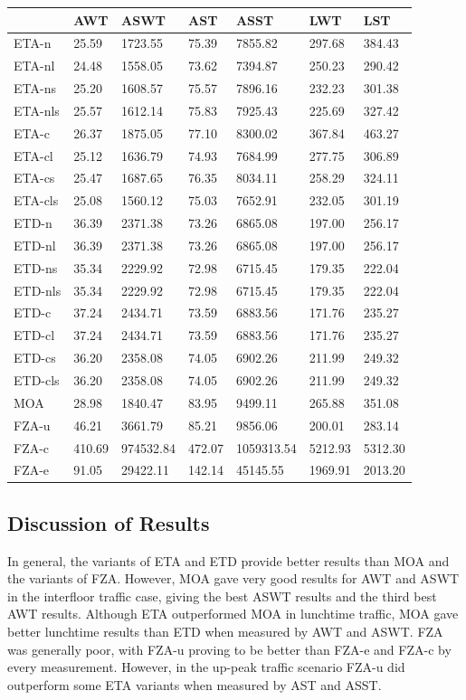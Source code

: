 \documentclass{UoYCSproject}
\begin{document}
\begin{tabular}{l | l l l l l l}
	& AWT & ASWT & AST & ASST & LWT & LST \\
	\hline
	ETA-n & 25.59 & 1723.55 & 75.39 & 7855.82 & 297.68 & 384.43 \\
	ETA-nl & 24.48 & 1558.05 & 73.62 & 7394.87 & 250.23 & 290.42 \\
	ETA-ns & 25.20 & 1608.57 & 75.57 & 7896.16 & 232.23 & 301.38 \\
	ETA-nls & 25.57 & 1612.14 & 75.83 & 7925.43 & 225.69 & 327.42 \\
	ETA-c & 26.37 & 1875.05 & 77.10 & 8300.02 & 367.84 & 463.27 \\
	ETA-cl & 25.12 & 1636.79 & 74.93 & 7684.99 & 277.75 & 306.89 \\
	ETA-cs & 25.47 & 1687.65 & 76.35 & 8034.11 & 258.29 & 324.11 \\
	ETA-cls & 25.08 & 1560.12 & 75.03 & 7652.91 & 232.05 & 301.19 \\
	\hline
	ETD-n & 36.39 & 2371.38 & 73.26 & 6865.08 & 197.00 & 256.17 \\
	ETD-nl & 36.39 & 2371.38 & 73.26 & 6865.08 & 197.00 & 256.17 \\
	ETD-ns & 35.34 & 2229.92 & 72.98 & 6715.45 & 179.35 & 222.04 \\
	ETD-nls & 35.34 & 2229.92 & 72.98 & 6715.45 & 179.35 & 222.04 \\
	ETD-c & 37.24 & 2434.71 & 73.59 & 6883.56 & 171.76 & 235.27 \\
	ETD-cl & 37.24 & 2434.71 & 73.59 & 6883.56 & 171.76 & 235.27 \\
	ETD-cs & 36.20 & 2358.08 & 74.05 & 6902.26 & 211.99 & 249.32 \\
	ETD-cls & 36.20 & 2358.08 & 74.05 & 6902.26 & 211.99 & 249.32 \\
	\hline
	MOA & 28.98 & 1840.47 & 83.95 & 9499.11 & 265.88 & 351.08 \\
	\hline
	FZA-u & 46.21 & 3661.79 & 85.21 & 9856.06 & 200.01 & 283.14 \\
	FZA-c & 410.69 & 974532.84 & 472.07 & 1059313.54 & 5212.93 & 5312.30 \\
	FZA-e & 91.05 & 29422.11 & 142.14 & 45145.55 & 1969.91 & 2013.20
\end{tabular}

\subsection{Discussion of Results}

In general, the variants of ETA and ETD provide better results than MOA and the variants of FZA.  However, MOA gave very good results for AWT and ASWT in the interfloor traffic case, giving the best ASWT results and the third best AWT results.  Although ETA outperformed MOA in lunchtime traffic, MOA gave better lunchtime results than ETD when measured by AWT and ASWT.  FZA was generally poor, with FZA-u proving to be better than FZA-e and FZA-c by every measurement.  However, in the up-peak traffic scenario FZA-u did outperform some ETA variants when measured by AST and ASST.
\end{document}
